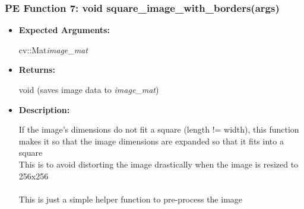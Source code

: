 \documentclass{scrreprt}
\begin{document}
\subsubsection{PE Function 7: void square\_image\_with\_borders(args)}
\begin{itemize}
    \item \textbf{Expected Arguments:}

    cv::Mat\quad\textit{image\_mat}

    \item \textbf{Returns:}

    void (saves image data to \textit{image\_mat})

    \item \textbf{Description:}

    If the image's dimensions do not fit a square (length != width), this function makes it so that the image dimensions are expanded so that it fits into a square
    \\
    This is to avoid distorting the image drastically when the image is resized to 256x256
    \\\\
    This is just a simple helper function to pre-process the image
\end{itemize}
\end{document}
